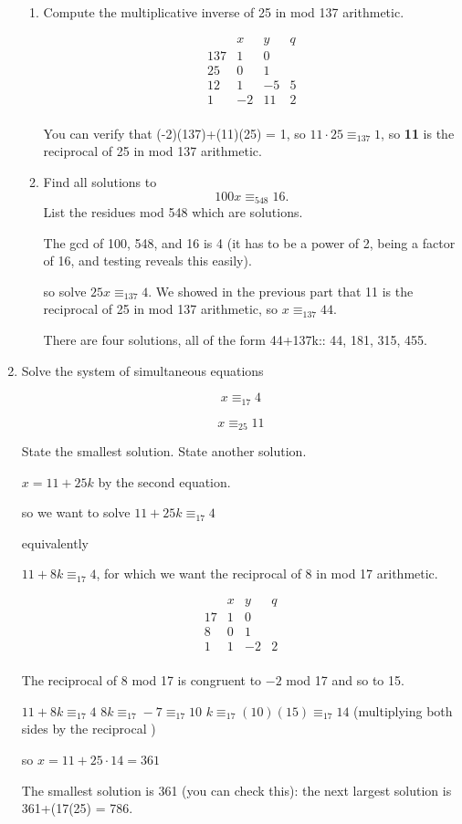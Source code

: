 \documentclass[12pt]{article}
\begin{document}
\begin{enumerate}
\begin{enumerate}
\item  Compute the multiplicative inverse of 25 in mod 137 arithmetic.

$$\begin{array}{cccc}
   &  x &  y & q \\
 137   &1   &0   &  \\
  25  &  0 & 1  &  \\
 12  &  1 & -5  & 5 \\
 1 & -2  &11  &   2\\
\end{array}$$

You can verify that (-2)(137)+(11)(25) = 1, so $11\cdot 25 \equiv_{137} 1$, so {\bf 11} is the reciprocal of 25 in mod 137 arithmetic.

\item  Find all solutions to $$100x \equiv_{548} 16.$$  List the residues mod 548 which are solutions.

The gcd of 100, 548, and 16 is 4 (it has to be a power of 2, being a factor of 16, and testing reveals this easily).

so solve $25x \equiv_{137} 4$.  We showed in the previous part that 11 is the reciprocal of 25 in mod 137 arithmetic,
so $x \equiv_{137} 44$.

There are four solutions, all of the form 44+137k::  44, 181, 315, 455.

\end{enumerate}

\newpage

\item  Solve the system of simultaneous equations 

$$x \equiv_{17} 4$$

$$x \equiv_{25}  11$$

State the smallest solution.  State another solution.

$x = 11+25k$ by the second equation.

so we want to solve $11+25k \equiv_{17} 4$

equivalently

$11+8k \equiv_{17} 4$, for which we want the reciprocal of 8 in mod 17 arithmetic.

$$\begin{array}{cccc}
   &  x &  y & q \\
 17   &1   &0   &  \\
  8  &  0 & 1  &  \\
 1  &  1 & -2  & 2 \\

\end{array}$$

The reciprocal of 8 mod 17 is congruent to $-2$ mod 17 and so to 15.

$11+8k \equiv_{17} 4$
$8k \equiv_{17} -7 \equiv_{17} 10$
$k \equiv_{17} (10)(15) \equiv_{17} 14$ (multiplying both sides by the reciprocal )

so $x = 11+25\cdot 14 = 361$

The smallest solution is 361 (you can check this):  the next largest solution is 361+(17(25) = 786.

\newpage

\end{enumerate}
\end{document}
